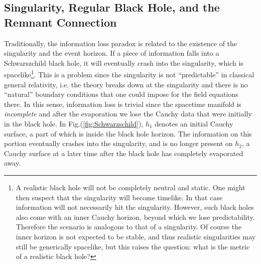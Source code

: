 \documentclass[12pt]{article}
\newcommand{\2}{$^2$}
\newcommand{\3}{$^3$}
\newcommand{\4}{$_4$}
\newcommand{\5}{$_5$}
\begin{document}
\subsection{Singularity, Regular Black Hole, and the Remnant Connection}\label{regular}

Traditionally, the information loss paradox is related to the existence of the singularity and the event horizon. If a piece of information falls into a Schwarszchild black hole, it will eventually crash into the singularity, which is spacelike\footnote{\color{black}A realistic black hole will not be completely neutral and static. One might then suspect that the singularity will become timelike. In that case information will not necessarily hit the singularity. However, such black holes also come with an inner Cauchy horizon, beyond which we lose predictability. Therefore the scenario is analogous to that of a singularity. Of course the inner horizon is not expected to be stable, and thus realistic singularities may still be generically spacelike, but this raises the question: what is the metric of a realistic black hole?}. This is a problem since the singularity is not ``predictable'' in classical general relativity, i.e. the theory breaks down at the singularity and there is no ``natural'' boundary conditions that one could impose for the field equations there. In this sense, information loss is trivial since the spacetime manifold is \emph{incomplete} and after the evaporation we lose the Cauchy data that were initially in the black hole. In Fig.(\ref{fig:Schwarzschild}), $h_1$ denotes an initial Cauchy surface, a part of which is inside the black hole horizon. The information on this portion eventually crashes into the singularity, and is no longer present on $h_2$, a Cauchy surface at a later time after the black hole has completely evaporated away.
\end{document}
